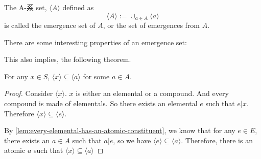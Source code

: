 \begin{axiom}\label{ax:the emergence-set-of-A}
    The A-系 set, $\langle A \rangle$ defined as
     $$\langle A \rangle := \cup_{a\in A} \langle a \rangle$$ 
     is called the emergence set of $A$, or the set of emergences from $A$. 
\end{axiom}


There are some interesting properties of an emergence set: 










This also implies, the following theorem. 
\begin{theorem}\label{thm:every-hai-set-is-a-subset-of-a-hai-set-whose-head-is-atomic}
    For any $x\in S$, $\langle x \rangle \subseteq \langle a \rangle$ for some $a\in A$.
\end{theorem}
\begin{proof}
    Consider $\langle x \rangle$. $x$ is either an elemental or a compound. And every compound is made of elementals. So there exists an elemental $e$ such that $e|x$. Therefore $\langle x \rangle \subseteq \langle e \rangle$. 
    
    By \ref{lem:every-elemental-has-an-atomic-constituent}, we know that for any $e \in E$, there exists an $a \in A$ such that $a|e$, so we have $\langle e \rangle \subseteq \langle a \rangle$. Therefore, there is an atomic $a$ such that $\langle x \rangle \subseteq \langle a \rangle$
    
\end{proof}


